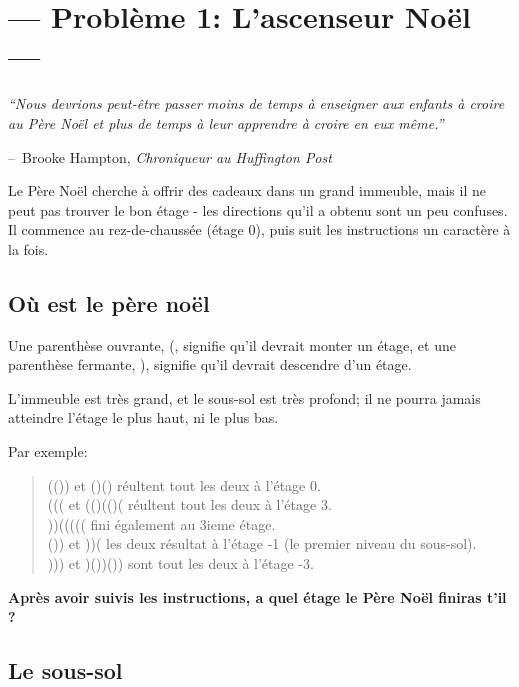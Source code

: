 \documentclass[12pt]{article}
\makeatletter
\newenvironment{example}{\begin{quote}%
}{%
\end{quote}%
}
\newenvironment{chapquote}[2][2em]
  {\setlength{\@tempdima}{#1}%
   \def\chapquote@author{#2}%
   \parshape 1 \@tempdima \dimexpr\textwidth-2\@tempdima\relax%
   \itshape}
  {\par\normalfont\hfill--\ \chapquote@author\hspace*{\@tempdima}\par\bigskip}
\makeatother
\begin{document}
\lstset{language=python}

\section*{\hfil--- Problème 1: L'ascenseur Noël ---\hfil}

  \begin{chapquote}{Brooke Hampton, \textit{Chroniqueur au Huffington Post}}
  ``Nous devrions peut-être passer moins de temps à enseigner aux enfants à croire au Père Noël et plus de temps à leur apprendre à croire en eux même.''
  \end{chapquote}


   Le Père Noël cherche à offrir des cadeaux dans un grand immeuble, mais il ne peut pas trouver le bon étage - les directions qu'il a obtenu sont un peu confuses. Il commence au rez-de-chaussée (étage 0), puis suit les instructions un caractère à la fois.


  \subsection* {Où est le père noël}

    Une parenthèse ouvrante, (, signifie qu'il devrait monter un étage, et une parenthèse fermante, ), signifie qu'il devrait descendre d'un étage.

    L'immeuble est très grand, et le sous-sol est très profond; il ne pourra jamais atteindre l'étage le plus haut, ni le plus bas.

    Par exemple:
    
    \begin{example}
      (())  et  ()()    réultent tout les deux à l'étage 0.\\
      (((   et  (()(()( réultent tout les deux à l'étage 3.\\
      ))(((((           fini également au 3ieme étage.\\
      ())   et  ))(     les deux résultat à l'étage -1 (le premier niveau du sous-sol).\\
      )))   et  )())()) sont tout les deux à l'étage -3.
    \end{example}
    
    \textbf{Après avoir suivis les instructions, a quel étage le Père Noël finiras t'il ?}  

  \subsection* {Le sous-sol}
\end{document}
